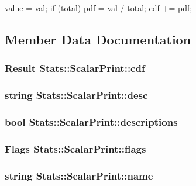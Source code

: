 \begin{DoxyCode}
{
    value = val;
    if (total) {
        pdf = val / total;
        cdf += pdf;
    }
}
\end{DoxyCode}


\subsection{Member Data Documentation}
\hypertarget{structStats_1_1ScalarPrint_aeb6a7afaa0bf80f0d8629d9798afc2e3}{
\subsubsection[{cdf}]{\setlength{\rightskip}{0pt plus 5cm}Result {\bf Stats::ScalarPrint::cdf}}}
\label{structStats_1_1ScalarPrint_aeb6a7afaa0bf80f0d8629d9798afc2e3}
\hypertarget{structStats_1_1ScalarPrint_a7489ca369b46014bdece1ecb9b90e097}{
\subsubsection[{desc}]{\setlength{\rightskip}{0pt plus 5cm}string {\bf Stats::ScalarPrint::desc}}}
\label{structStats_1_1ScalarPrint_a7489ca369b46014bdece1ecb9b90e097}
\hypertarget{structStats_1_1ScalarPrint_a738a9523ba5234d01d11127b1dc1eb8d}{
\subsubsection[{descriptions}]{\setlength{\rightskip}{0pt plus 5cm}bool {\bf Stats::ScalarPrint::descriptions}}}
\label{structStats_1_1ScalarPrint_a738a9523ba5234d01d11127b1dc1eb8d}
\hypertarget{structStats_1_1ScalarPrint_a920e3f724dce9d9a24810a16ffacb4bb}{
\subsubsection[{flags}]{\setlength{\rightskip}{0pt plus 5cm}Flags {\bf Stats::ScalarPrint::flags}}}
\label{structStats_1_1ScalarPrint_a920e3f724dce9d9a24810a16ffacb4bb}
\hypertarget{structStats_1_1ScalarPrint_a5be372119c7d55a9d96688aaa060cc79}{
\subsubsection[{name}]{\setlength{\rightskip}{0pt plus 5cm}string {\bf Stats::ScalarPrint::name}}}
